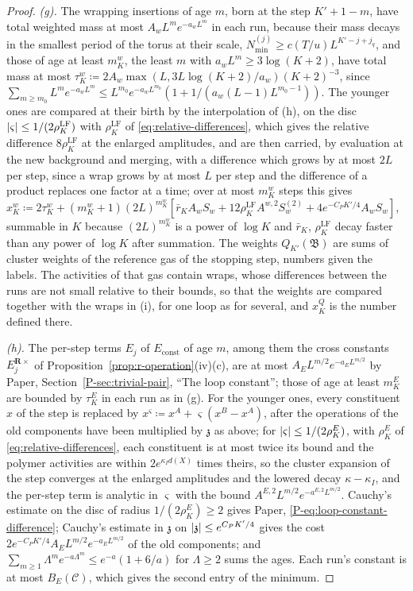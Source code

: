 \documentclass[11pt]{preprint}
\DeclarePairedDelimiter{\abs}{\lvert}{\rvert}
\numberwithin{equation}{section}
\theoremstyle{definition}
\theoremstyle{remark}
\theoremstyle{plain}
\begin{document}
\begin{proof}
\emph{(g).} The wrapping insertions of age $m$, born at the step $K' + 1 - m$, have total weighted mass at most $A_wL^me^{-a_wL^m}$ in each run, because their mass decays in the smallest period of the torus at their scale, $N^{(j)}_{\min} \geq c(T/u)L^{K'-j+j_q}$, and those of age at least $m^w_K$, the least $m$ with $a_wL^m \geq 3\log(K + 2)$, have total mass at most $\tau^w_K \coloneqq 2A_w\max(L, 3L\log(K + 2)/a_w)(K + 2)^{-3}$, since $\sum_{m \geq m_0}L^me^{-a_wL^m} \leq L^{m_0}e^{-a_wL^{m_0}}(1 + 1/(a_w(L - 1)L^{m_0-1}))$. The younger ones are compared at their birth by the interpolation of (h), on the disc $\abs\varsigma \leq 1/(2\rho^{\mathrm{LF}}_K)$ with $\rho^{\mathrm{LF}}_K$ of \eqref{eq:relative-differences}, which gives the relative difference $8\rho^{\mathrm{LF}}_K$ at the enlarged amplitudes, and are then carried, by evaluation at the new background and merging, with a difference which grows by at most $2L$ per step, since a wrap grows by at most $L$ per step and the difference of a product replaces one factor at a time; over at most $m^w_K$ steps this gives $x^w_K \coloneqq 2\tau^w_K + (m^w_K + 1)(2L)^{m^w_K}[\bar r_KA_wS_w + 12\rho^{\mathrm{LF}}_KA^{w,2}S^{(2)}_w + 4e^{-C_PK'/4}A_wS_w]$, summable in $K$ because $(2L)^{m^w_K}$ is a power of $\log K$ and $\bar r_K$, $\rho^{\mathrm{LF}}_K$ decay faster than any power of $\log K$ after summation. The weights $Q_{K'}(\mathfrak B)$ are sums of cluster weights of the reference gas of the stopping step, numbers given the labels. The activities of that gas contain wraps, whose differences between the runs are not small relative to their bounds, so that the weights are compared together with the wraps in (i), for one loop as for several, and $x^Q_K$ is the number defined there.

\emph{(h).} The per-step terms $E_j$ of $E_{\mathrm{const}}$ of age $m$, among them the cross constants $E^{\mathbf R\times}_j$ of Proposition~\ref{prop:r-operation}(iv)(c), are at most $A_EL^{m/2}e^{-a_EL^{m/2}}$ by Paper, Section~\ref{P-sec:trivial-pair}, ``The loop constant''; those of age at least $m^E_K$ are bounded by $\tau^E_K$ in each run as in (g). For the younger ones, every constituent $x$ of the step is replaced by $x^\varsigma \coloneqq x^A + \varsigma(x^B - x^A)$, after the operations of the old components have been multiplied by $\mathfrak z$ as above; for $\abs\varsigma \leq 1/(2\rho^E_K)$, with $\rho^E_K$ of \eqref{eq:relative-differences}, each constituent is at most twice its bound and the polymer activities are within $2e^{\kappa_Id(X)}$ times theirs, so the cluster expansion of the step converges at the enlarged amplitudes and the lowered decay $\kappa - \kappa_I$, and the per-step term is analytic in $\varsigma$ with the bound $A^{E,2}L^{m/2}e^{-a^{E,2}L^{m/2}}$. Cauchy's estimate on the disc of radius $1/(2\rho^E_K) \geq 2$ gives Paper, \eqref{P-eq:loop-constant-difference}; Cauchy's estimate in $\mathfrak z$ on $\abs{\mathfrak z} \leq e^{C_PK'/4}$ gives the cost $2e^{-C_PK'/4}A_EL^{m/2}e^{-a_EL^{m/2}}$ of the old components; and $\sum_{m \geq 1}\Lambda^me^{-a\Lambda^m} \leq e^{-a}(1 + 6/a)$ for $\Lambda \geq 2$ sums the ages. Each run's constant is at most $B_E(\mathcal C)$, which gives the second entry of the minimum.


\end{proof}
\end{document}
